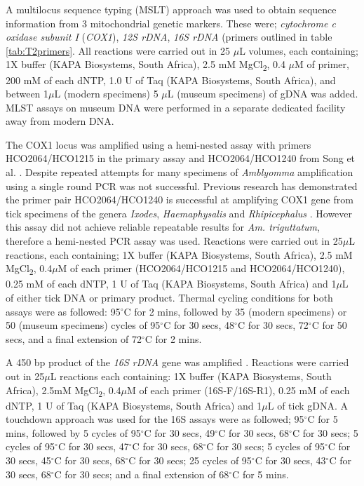 \documentclass[a4paper, nobind]{templates/ociamthesis}
\begin{document}
A multilocus sequence typing (MSLT) approach was used to obtain sequence information from 3 mitochondrial genetic markers. These were; \emph{cytochrome c oxidase subunit I} (\emph{COX1}), \emph{12S rDNA}, \emph{16S rDNA} (primers outlined in table \ref{tab:T2primers}.
All reactions were carried out in 25 \(\mu\)L volumes, each containing; 1X buffer (KAPA Biosystems, South Africa), 2.5 mM MgCl\textsubscript{2}, 0.4 \(\mu\)M of primer, 200 mM of each dNTP, 1.0 U of Taq (KAPA Biosystems, South Africa), and between 1\(\mu\)L (modern specimens) 5 \(\mu\)L (museum specimens) of gDNA was added. MLST assays on museum DNA were performed in a separate dedicated facility away from modern DNA.

The COX1 locus was amplified using a hemi-nested assay with primers HCO2064/HCO1215 in the primary assay and HCO2064/HCO1240 from Song et al. \autocite*{songPhylogeneticPhylogeographicRelationships2011}.
Despite repeated attempts for many specimens of \emph{Amblyomma} amplification using a single round PCR was not successful. Previous research has demonstrated the primer pair HCO2064/HCO1240 is successful at amplifying COX1 gene from tick specimens of the genera \emph{Ixodes}, \emph{Haemaphysalis} and \emph{Rhipicephalus} \autocite{evansAutomaticBarcodeGap2019}.
However this assay did not achieve reliable repeatable results for \emph{Am. triguttatum}, therefore a hemi-nested PCR assay was used.
Reactions were carried out in 25\(\mu\)L reactions, each containing; 1X buffer (KAPA Biosystems, South Africa), 2.5 mM MgCl\textsubscript{2}, 0.4\(\mu\)M of each primer (HCO2064/HCO1215 and HCO2064/HCO1240), 0.25 mM of each dNTP, 1 U of Taq (KAPA Biosystems, South Africa) and 1\(\mu\)L of either tick DNA or primary product. Thermal cycling conditions for both assays were as followed: 95\(^\circ\)C for 2 mins, followed by 35 (modern specimens) or 50 (museum specimens) cycles of 95\(^\circ\)C for 30 secs, 48\(^\circ\)C for 30 secs, 72\(^\circ\)C for 50 secs, and a final extension of 72\(^\circ\)C for 2 mins.

A 450 bp product of the \emph{16S rDNA} gene was amplified \autocite{lvDevelopmentDNABarcoding2014}. Reactions were carried out in 25\(\mu\)L reactions each containing: 1X buffer (KAPA Biosystems, South Africa), 2.5mM MgCl\textsubscript{2}, 0.4\(\mu\)M of each primer (16S-F/16S-R1), 0.25 mM of each dNTP, 1 U of Taq (KAPA Biosystems, South Africa) and 1\(\mu\)L of tick gDNA. A touchdown approach was used for the 16S assays were as followed; 95\(^\circ\)C for 5 mins, followed by 5 cycles of 95\(^\circ\)C for 30 secs, 49\(^\circ\)C for 30 secs, 68\(^\circ\)C for 30 secs; 5 cycles of 95\(^\circ\)C for 30 secs, 47\(^\circ\)C for 30 secs, 68\(^\circ\)C for 30 secs; 5 cycles of 95\(^\circ\)C for 30 secs, 45\(^\circ\)C for 30 secs, 68\(^\circ\)C for 30 secs; 25 cycles of 95\(^\circ\)C for 30 secs, 43\(^\circ\)C for 30 secs, 68\(^\circ\)C for 30 secs; and a final extension of 68\(^\circ\)C for 5 mins.
\end{document}
